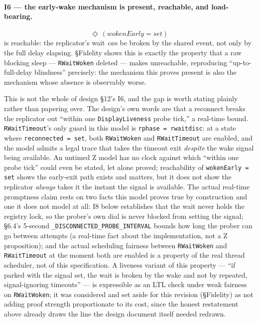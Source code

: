 \documentclass[a4paper,10pt,fleqn]{article}
\begin{document}
\paragraph{I6 --- the early-wake mechanism is present, reachable, and
load-bearing.}
\[
  \Diamond\,(wokenEarly = set)
\]
is reachable: the replicator's wait \emph{can} be broken by the shared
event, not only by the full delay elapsing.  \S Fidelity shows this is
exactly the property that a raw blocking sleep --- \texttt{RWaitWoken}
deleted --- makes unreachable, reproducing ``up-to-full-delay blindness''
precisely: the mechanism this proves present is also the mechanism whose
absence is observably worse.

This is not the whole of design \S12's I6, and the gap is worth stating
plainly rather than papering over.  The design's own words are that a
reconnect breaks the replicator out ``within one \texttt{DisplayLiveness}
probe tick,'' a real-time bound.  \texttt{RWaitTimeout}'s only guard in
this model is \texttt{rphase = rwaitdisc}: at a state where
\texttt{reconnected = set}, both \texttt{RWaitWoken} and
\texttt{RWaitTimeout} are enabled, and the model admits a legal trace that
takes the timeout exit \emph{despite} the wake signal being available.  An
untimed Z model has no clock against which ``within one probe tick'' could
even be stated, let alone proved; reachability of
\texttt{wokenEarly = set} shows the early-exit path exists and matters, but
it does not show the replicator \emph{always} takes it the instant the
signal is available.  The actual real-time promptness claim rests on two
facts this model proves true by construction and one it does not model at
all: I8 below establishes that the wait never holds the registry lock, so
the prober's own dial is never blocked from setting the signal; \S6.4's
5-second \texttt{\_DISCONNECTED\_PROBE\_INTERVAL} bounds how long the
prober can go between attempts (a real-time fact about the implementation,
not a Z proposition); and the actual scheduling fairness between
\texttt{RWaitWoken} and \texttt{RWaitTimeout} at the moment both are
enabled is a property of the real thread scheduler, not of this
specification. A liveness variant of this property --- ``if parked with
the signal set, the wait is broken by the wake and not by repeated,
signal-ignoring timeouts'' --- is expressible as an LTL check under weak
fairness on \texttt{RWaitWoken}; it was considered and set aside for this
revision (\S Fidelity) as not adding proof strength proportionate to its
cost, since the honest restatement above already draws the line the design
document itself needed redrawn.
\end{document}
